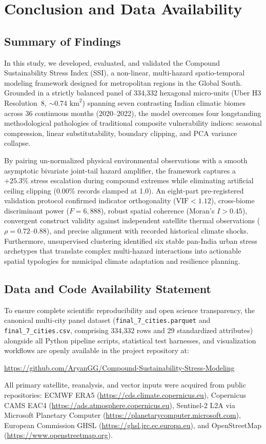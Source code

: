 \section{Conclusion and Data Availability}
\label{sec:conclusion}

\subsection{Summary of Findings}
In this study, we developed, evaluated, and validated the Compound Sustainability Stress Index (SSI), a non-linear, multi-hazard spatio-temporal modeling framework designed for metropolitan regions in the Global South. Grounded in a strictly balanced panel of 334,332 hexagonal micro-units (Uber H3 Resolution~8, $\sim 0.74\text{ km}^2$) spanning seven contrasting Indian climatic biomes across 36 continuous months (2020--2022), the model overcomes four longstanding methodological pathologies of traditional composite vulnerability indices: seasonal compression, linear substitutability, boundary clipping, and PCA variance collapse.

By pairing un-normalized physical environmental observations with a smooth asymptotic bivariate joint-tail hazard amplifier, the framework captures a $+25.3\%$ stress escalation during compound extremes while eliminating artificial ceiling clipping ($0.00\%$ records clamped at 1.0). An eight-part pre-registered validation protocol confirmed indicator orthogonality ($\text{VIF} < 1.12$), cross-biome discriminant power ($F = 6,888$), robust spatial coherence (Moran's $I > 0.45$), convergent construct validity against independent satellite thermal observations ($\rho = 0.72\text{--}0.88$), and precise alignment with recorded historical climate shocks. Furthermore, unsupervised clustering identified six stable pan-India urban stress archetypes that translate complex multi-hazard interactions into actionable spatial typologies for municipal climate adaptation and resilience planning.

\subsection{Data and Code Availability Statement}
To ensure complete scientific reproducibility and open science transparency, the canonical multi-city panel dataset (\texttt{final\_7\_cities.parquet} and \texttt{final\_7\_cities.csv}, comprising 334,332 rows and 29 standardized attributes) alongside all Python pipeline scripts, statistical test harnesses, and visualization workflows are openly available in the project repository at:
\begin{center}
    \url{https://github.com/AryanGG/Compound-Sustainability-Stress-Modeling}
\end{center}
All primary satellite, reanalysis, and vector inputs were acquired from public repositories: ECMWF ERA5 (\url{https://cds.climate.copernicus.eu}), Copernicus CAMS EAC4 (\url{https://ads.atmosphere.copernicus.eu}), Sentinel-2 L2A via Microsoft Planetary Computer (\url{https://planetarycomputer.microsoft.com}), European Commission GHSL (\url{https://ghsl.jrc.ec.europa.eu}), and OpenStreetMap (\url{https://www.openstreetmap.org}).
